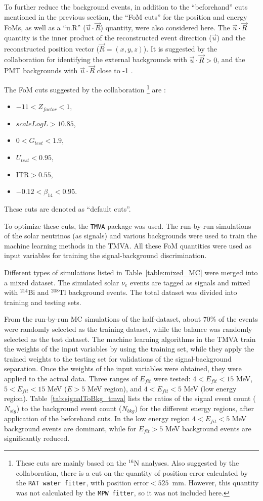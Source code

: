 To further reduce the background events, in addition to the ``beforehand'' cuts mentioned in the previous section, the ``FoM cuts'' for the position and energy FoMs, as well as a ``u.R'' ($\vec{u}\cdot \vec{R}$) quantity, were also considered here. The $\vec{u}\cdot\vec{R}$ quantity is the inner product of the reconstructed event direction ($\vec{u}$) and the reconstructed position vector ($\vec{R}=(x,y,z)$). It is suggested by the collaboration for identifying the external backgrounds with $\vec{u}\cdot\vec{R}>0$, and the PMT backgrounds with $\vec{u}\cdot \vec{R}$ close to -1 \cite{waterunidoc}.

The FoM cuts suggested by the collaboration \footnote{These cuts are mainly based on the $^{16}$N analyses. Also suggested by the collaboration, there is a cut on the quantity of position error calculated by the \texttt{RAT water fitter}, with position error$<525$~mm. However, this quantity was not calculated by the \texttt{MPW fitter}, so it was not included here.} are \cite{morganFOM}: 
\begin{itemize}
    \item $-11<Z_{factor}<1$\;, 
    \item $scaleLogL>10.85$\;,
    \item $0<G_{test}<1.9$\;,
    \item $U_{test}<0.95$\;,
    \item $\mathrm{ITR}>0.55$\;,
    \item $-0.12<\beta_{14}<0.95$\;.
\end{itemize}
These cuts are denoted as ``default cuts''.

To optimize these cuts, the \texttt{TMVA} package was used. The run-by-run simulations of the solar neutrinos (as signals) and various backgrounds were used to train the machine learning methods in the TMVA. All these FoM quantities were used as input variables for training the signal-background discrimination.

Different types of simulations listed in Table~\ref{table:mixed_MC} were merged into a mixed dataset. The simulated solar $\nu_e$ events are tagged as signals and mixed with $^{214}$Bi and $^{208}$Tl background events. The total dataset was divided into training and testing sets. 

From the run-by-run MC simulations of the half-dataset, about 70\% of the events were randomly selected as the training dataset, while the balance was randomly selected as the test dataset. The machine learning algorithms in the TMVA train the weights of the input variables by using the training set, while they apply the trained weights to the testing set for validations of the signal-background separation. Once the weights of the input variables were obtained, they were applied to the actual data. Three ranges of $E_{fit}$ were tested: $4<E_{fit}<15$ MeV, $5<E_{fit}<15$ MeV ($E>5$ MeV region), and $4<E_{fit}<5$ MeV (low energy region). Table~\ref{tab:signalToBkg_tmva} lists the ratios of the signal event count ($N_{sig}$) to the background event count ($N_{bkg}$) for the different energy regions, after application of the beforehand cuts. In the low energy region $4<E_{fit}<5$ MeV background events are dominant, while for  $E_{fit}>5$ MeV background events are significantly reduced.

